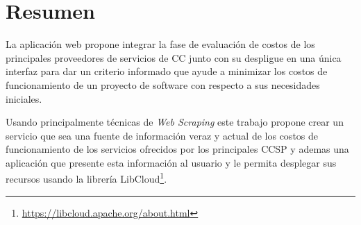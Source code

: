 

\begingroup
\let\clearpage\relax
\let\cleardoublepage\relax
\let\cleardoublepage\relax




\chapter*{Resumen}
La aplicación web \appName propone integrar la fase de evaluación de costos de los principales proveedores de servicios de \acrfull{CC} junto con su despligue en una única interfaz para dar un criterio informado que ayude a minimizar los costos de funcionamiento de un proyecto de software con respecto a sus necesidades iniciales.\bigskip

Usando principalmente técnicas de \emph{Web Scraping} este trabajo propone crear un servicio que sea una fuente de información veraz y actual de los costos de funcionamiento de los servicios ofrecidos por los principales \acrfull{CCSP} y ademas una aplicación que presente esta información al usuario y le permita desplegar sus recursos usando la librería \gls{LibCloud}\footnote{\url{https://libcloud.apache.org/about.html}}.
\endgroup			

\vfill